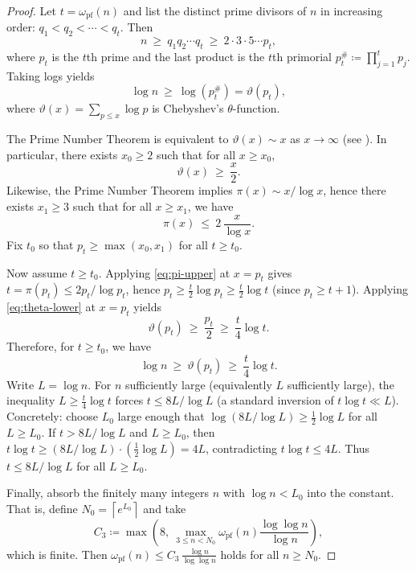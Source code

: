 \documentclass[12pt]{amsart}
\theoremstyle{plain}
\theoremstyle{definition}
\newcommand{\pif}{\pi} %
\newcommand{\thetaf}{\vartheta} %
\newcommand{\omegapf}{\omega_{\mathrm{pf}}} %
\begin{document}
\begin{proof}
Let $t=\omegapf(n)$ and list the distinct prime divisors of $n$ in increasing order:
$q_1<q_2<\cdots<q_t$. Then
\[
n\ \ge\ q_1q_2\cdots q_t\ \ge\ 2\cdot 3\cdot 5\cdots p_t,
\]
where $p_t$ is the $t$th prime and the last product is the $t$th primorial
$p_t^\# \coloneq \prod_{j=1}^{t} p_j$.
Taking logs yields
\[
\log n\ \ge\ \log(p_t^\#)=\thetaf(p_t),
\]
where $\thetaf(x)=\sum_{p\le x}\log p$ is Chebyshev's $\theta$-function.

The Prime Number Theorem is equivalent to $\thetaf(x)\sim x$ as $x\to\infty$
(see \cite[Ch.~4]{Apostol1976}).
In particular, there exists $x_0\ge 2$ such that for all $x\ge x_0$,
\begin{equation}\label{eq:theta-lower}
\thetaf(x)\ \ge\ \frac{x}{2}.
\end{equation}
Likewise, the Prime Number Theorem implies $\pif(x)\sim x/\log x$, hence there
exists $x_1\ge 3$ such that for all $x\ge x_1$, we have
\begin{equation}\label{eq:pi-upper}
\pif(x)\ \le\ 2\,\frac{x}{\log x}.
\end{equation}
Fix $t_0$ so that $p_t\ge \max(x_0,x_1)$ for all $t\ge t_0$.

Now assume $t\ge t_0$.
Applying \eqref{eq:pi-upper} at $x=p_t$ gives
$t=\pif(p_t)\le 2p_t/\log p_t$, hence
$p_t\ge \tfrac{t}{2}\log p_t \ge \tfrac{t}{2}\log t$ (since $p_t\ge t+1$).
Applying \eqref{eq:theta-lower} at $x=p_t$ yields
\[
\thetaf(p_t)\ \ge\ \frac{p_t}{2}\ \ge\ \frac{t}{4}\log t.
\]
Therefore, for $t\ge t_0$, we have
\[
\log n \ \ge\ \thetaf(p_t)\ \ge\ \frac{t}{4}\log t.
\]
Write $L=\log n$.
For $n$ sufficiently large (equivalently $L$ sufficiently large), the inequality
$L\ge \tfrac{t}{4}\log t$ forces $t\le 8L/\log L$ (a standard inversion of
$t\log t\ll L$).
Concretely: choose $L_0$ large enough that $\log(8L/\log L)\ge \tfrac12\log L$
for all $L\ge L_0$. If $t>8L/\log L$ and $L\ge L_0$, then
$t\log t \ge (8L/\log L)\cdot (\tfrac12\log L)=4L$, contradicting $t\log t\le 4L$.
Thus $t\le 8L/\log L$ for all $L\ge L_0$.

Finally, absorb the finitely many integers $n$ with $\log n<L_0$ into the constant.
That is, define $N_0=\left\lceil e^{L_0}\right\rceil$ and take
\[
C_3 \coloneq \max\!\left( 8,\ \max_{3\le n<N_0}\omegapf(n)\frac{\log\log n}{\log n}\right),
\]
which is finite.
Then $\omegapf(n)\le C_3\,\frac{\log n}{\log\log n}$ holds for all $n\ge N_0$.
\end{proof}
\end{document}
